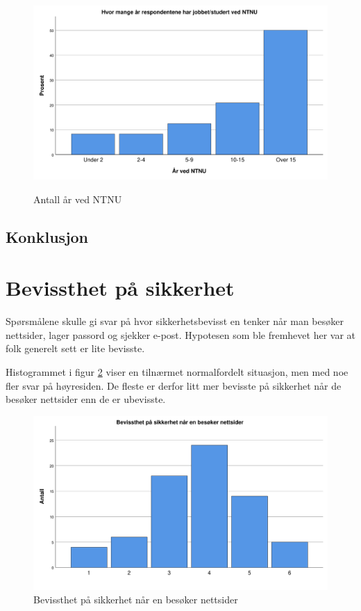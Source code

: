 \begin{figure}[H]
    \centering
    \includegraphics[scale=0.5]{case_2/bilder/spss/aarvedNTNU.pdf}
    \label{fig:aarvedNTNU}
    \caption[aarvedNTNU]{Antall år ved NTNU}
\end{figure}


\subsection{Konklusjon}

\section{Bevissthet på sikkerhet}
Spørsmålene skulle gi svar på hvor sikkerhetsbevisst en tenker når man besøker nettsider, lager passord og sjekker e-post. Hypotesen som ble fremhevet her var at folk generelt sett er lite bevisste. 

Histogrammet i figur \ref{fig:bevisst-nettsider} viser en tilnærmet normalfordelt situasjon, men med noe fler svar på høyresiden. De fleste er derfor litt mer bevisste på sikkerhet når de besøker nettsider enn de er ubevisste. 
\begin{figure}[H]
    \centering
    \includegraphics[scale=0.5]{case_2/bilder/spss/bevisst_nettsider.pdf}
    \caption[bevisst-nettsider]{Bevissthet på sikkerhet når en besøker nettsider}
    \label{fig:bevisst-nettsider}
\end{figure}

